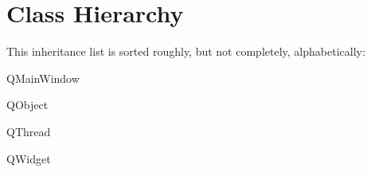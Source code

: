 \section{Class Hierarchy}
This inheritance list is sorted roughly, but not completely, alphabetically\+:\begin{DoxyCompactList}
\item Q\+Main\+Window\begin{DoxyCompactList}
\item {}
\end{DoxyCompactList}
\item Q\+Object\begin{DoxyCompactList}
\item {}
\end{DoxyCompactList}
\item Q\+Thread\begin{DoxyCompactList}
\item {}
\end{DoxyCompactList}
\item Q\+Widget\begin{DoxyCompactList}
\item {}
\end{DoxyCompactList}
\item {}
\end{DoxyCompactList}
